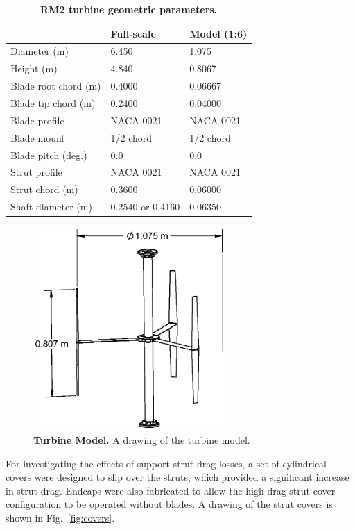 \documentclass[10pt,letterpaper]{article}
\begin{document}
\begin{table}[ht]
\centering
\begin{tabular}{l|l|l}
   & Full-scale & Model (1:6) \\
\hline
Diameter (m)   & 6.450 & 1.075 \\
Height (m)     & 4.840 & 0.8067 \\
Blade root chord (m) & 0.4000 & 0.06667 \\
Blade tip chord (m)  & 0.2400 & 0.04000 \\
Blade profile & NACA 0021 & NACA 0021 \\
Blade mount & 1/2 chord & 1/2 chord \\
Blade pitch (deg.) & 0.0 & 0.0 \\
Strut profile & NACA 0021 & NACA 0021 \\
Strut chord (m) & 0.3600 & 0.06000 \\
Shaft diameter (m) & 0.2540 \cite{Beam2011} or 0.4160 \cite{Hill2014} & 0.06350\\
\end{tabular}
\caption{\textbf{RM2 turbine geometric parameters.}}
\label{tab:turb-geom}
\end{table}

\begin{figure}[h]
    \includegraphics[width=0.65\textwidth]{figures/turbine.eps}

    \caption{{\bf Turbine Model.} A drawing of the turbine model.}

    \label{fig:turbine-drawing}
\end{figure}

For investigating the effects of support strut drag losses, a set of cylindrical
covers were designed to slip over the struts, which provided a significant
increase in strut drag. Endcaps were also fabricated to allow the high drag
strut cover configuration to be operated without blades. A drawing of the strut
covers is shown in Fig.~\ref{fig:covers}.
\end{document}
